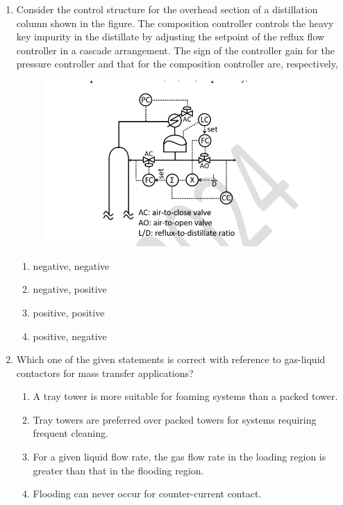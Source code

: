 \documentclass[journal,12pt,onecolumn]{IEEEtran}
\theoremstyle{remark}
\begin{document}
\begin{enumerate}
		\item Consider the control structure for the overhead section of a distillation column shown in the figure. The composition controller  controls the heavy key impurity in the distillate by adjusting the setpoint of the reflux flow controller in a cascade arrangement. The sign of the controller gain for the pressure controller  and that for the composition controller  are, respectively,
		\begin{figure}
			\includegraphics[width = 0.8\columnwidth]{q23}
			\caption*{}
			\label{fig:q23}
		\end{figure}
		
		\hfill{}
		\begin{enumerate}
			\item negative, negative
			\item negative, positive
			\item positive, positive
			\item positive, negative
		\end{enumerate}
		
		\item Which one of the given statements is correct with reference to gas-liquid contactors for mass transfer applications?
		
		\hfill{}
		\begin{enumerate}
			\item A tray tower is more suitable for foaming systems than a packed tower.
			\item Tray towers are preferred over packed towers for systems requiring frequent cleaning.
			\item For a given liquid flow rate, the gas flow rate in the loading region is greater than that in the flooding region.
			\item Flooding can never occur for counter-current contact.
		\end{enumerate}
		

\end{enumerate}
\end{document}
